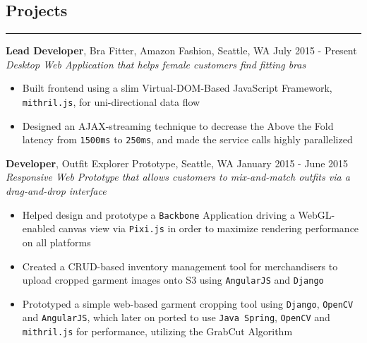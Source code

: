 \documentclass[line]{res} %
\begin{document}
\begin{resume}
  \section{Projects}
  \rule{\textwidth}{1pt}
    \textbf{Lead Developer}, Bra Fitter, Amazon Fashion, Seattle, WA
    \hfill July 2015 - Present \\
    \textit{Desktop Web Application that helps female customers find fitting bras}
    \begin{itemize} \itemsep -2pt  %
      \item Built frontend using a slim Virtual-DOM-Based JavaScript Framework,
            \texttt{mithril.js}, for uni-directional data flow
      \item Designed an AJAX-streaming technique to decrease the Above the Fold latency from \texttt{1500ms} to
            \texttt{250ms}, and made the service calls highly parallelized
		\end{itemize}

    \textbf{Developer}, Outfit Explorer Prototype, Seattle, WA
    \hfill January 2015 - June 2015 \\
    \textit{Responsive Web Prototype that allows customers to mix-and-match outfits
            via a drag-and-drop interface}
    \begin{itemize} \itemsep -2pt  %
      \item Helped design and prototype a \texttt{Backbone} Application driving a WebGL-enabled canvas view via
            \texttt{Pixi.js} in order to maximize rendering performance on all platforms
      \item Created a CRUD-based inventory management tool for merchandisers to upload cropped garment images onto S3
            using \texttt{AngularJS} and \texttt{Django}
      \item Prototyped a simple web-based garment cropping tool using \texttt{Django}, \texttt{OpenCV} and
            \texttt{AngularJS}, which later on ported to use \texttt{Java Spring}, \texttt{OpenCV} and
            \texttt{mithril.js} for performance, utilizing the GrabCut Algorithm
    \end{itemize}


\end{resume}
\end{document}

